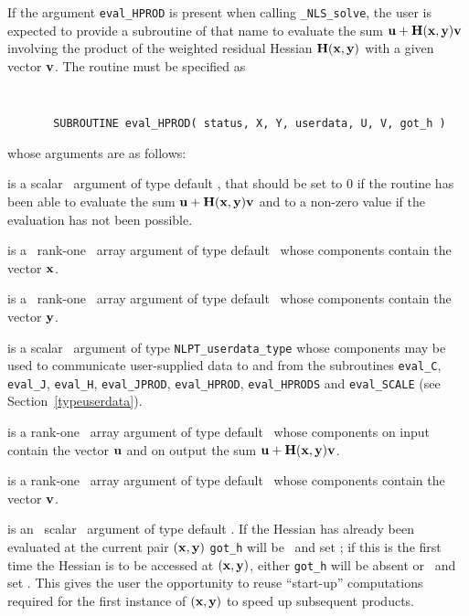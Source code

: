 \documentclass{galahad}
\newcommand{\packagename}{NLS}
\newcommand{\fullpackagename}{\libraryname\_\packagename}
\newcommand{\solver}{{\tt \fullpackagename\_solve}}
\begin{document}
If the argument {\tt eval\_HPROD} is present when calling \solver, the
user is expected to provide a subroutine of that name to evaluate the
sum ${\mathbf{u}} + {\mathbf{H}}({\mathbf{x}},{\mathbf{y}}) {\mathbf{v}}$ involving the
product of the weighted residual Hessian ${\mathbf{H}}({\mathbf{x}},{\mathbf{y}})$
with a given vector ${\mathbf{v}}$.
The routine must be specified as

\def\baselinestretch{0.8}
{\tt
\begin{verbatim}
       SUBROUTINE eval_HPROD( status, X, Y, userdata, U, V, got_h )
\end{verbatim} }
\def\baselinestretch{1.0}
\noindent whose arguments are as follows:

\begin{description}
 is a scalar \intentout\ argument of type default \integer,
that should be set to 0 if the routine has been able to evaluate the
sum ${\mathbf{u}} + {\mathbf{H}}({\mathbf{x}},{\mathbf{y}}){\mathbf{v}}$
and to a non-zero value if the evaluation has not been possible.

 is a \ rank-one \intentin\ array argument of type
default \realdp\ whose components contain the vector ${\mathbf{x}}$.

 is a \ rank-one \intentin\ array argument of type
default \realdp\ whose components contain the vector ${\mathbf{y}}$.

 is a scalar \intentinout\ argument of type
{\tt NLPT\_userdata\_type} whose components may be used
to communicate user-supplied data to and from the subroutines
{\tt eval\_C}, {\tt eval\_J}, {\tt eval\_H}, {\tt eval\_JPROD},
{\tt eval\_HPROD}, {\tt eval\_HPRODS} and {\tt eval\_SCALE}
(see Section~\ref{typeuserdata}).

 is a rank-one \intentinout\ array argument of type default \realdp\
whose components on input contain the vector ${\mathbf{u}}$ and on output the
sum ${\mathbf{u}} + {\mathbf{H}}({\mathbf{x}},{\mathbf{y}}) {\mathbf{v}}$.

 is a rank-one \intentin\ array argument of type default \realdp\
whose components contain the vector ${\mathbf{v}}$.

 is an \optional\ scalar \intentin\ argument of type default
\logical. If the Hessian has already been evaluated at the current pair
$({\mathbf{x}},{\mathbf{y}})$
{\tt got\_h} will be \present\ and set \true; if this is the first time
the Hessian is to be accessed at $({\mathbf{x}},{\mathbf{y}})$, either {\tt got\_h} will
be absent or \present\ and set \false. This gives the user the opportunity
to reuse ``start-up'' computations required for the first instance of
$({\mathbf{x}},{\mathbf{y}})$ to speed up subsequent products.

\end{description}
\end{document}
